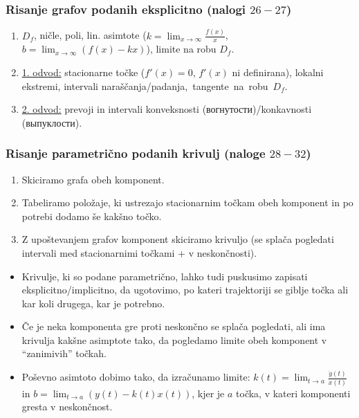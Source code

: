 {\color{Purple} \subsubsection*{Risanje grafov podanih eksplicitno (nalogi $26-27$)}}
\begin{enumerate}
    \item $D_f$, ničle, poli, lin. asimtote ($\displaystyle k = \lim_{x \to \infty} \frac{f(x)}{x}$, $\displaystyle b = \lim_{x \to \infty} (f(x) - kx)$), limite na robu $D_f$.
    \item \underline{1. odvod:} stacionarne točke ($f'(x)=0$, $f'(x)$ ni definirana), lokalni ekstremi, intervali naraščanja/padanja,~tangente~na~robu~$D_f$.
    \item \underline{2. odvod:} prevoji in intervali konveksnosti (вогнутости)/konkavnosti (выпуклости).
\end{enumerate}
%
%
{\color{Purple} \subsubsection*{Risanje parametrično podanih krivulj (naloge $28-32$)}}
\begin{enumerate}
    \item Skiciramo grafa obeh komponent.
    \item Tabeliramo položaje, ki ustrezajo stacionarnim točkam obeh komponent in po potrebi dodamo še kakšno točko.
    \item Z upoštevanjem grafov komponent skiciramo krivuljo (se splača pogledati intervali med stacionarnimi točkami + v neskončnosti).
\end{enumerate}

\begin{itemize}
    \item Krivulje, ki so podane parametrično, lahko tudi puskusimo zapisati eksplicitno/implicitno, da ugotovimo, po kateri trajektoriji se giblje točka ali kar koli drugega, kar je potrebno.    
    \item Če je neka komponenta gre proti neskončno se splača pogledati, ali ima krivulja kakšne asimptote tako, da pogledamo limite obeh komponent v "`zanimivih"' točkah.
    \item Poševno asimtoto dobimo tako, da izračunamo limite: $\displaystyle k(t) =\lim_{t \to a} \frac{\dot{y}(t)}{\dot{x}(t)}$ in $\displaystyle b = \lim_{t \to a} (y(t) - k(t) x(t))$, kjer je $a$ točka, v kateri komponenti gresta v neskončnost.
\end{itemize}

